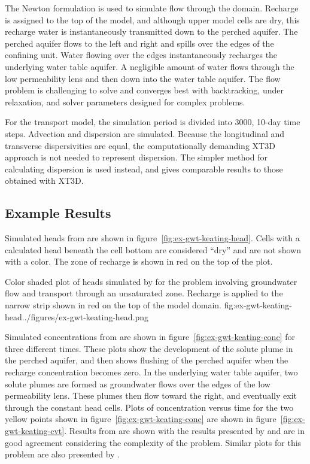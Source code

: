 The Newton formulation is used to simulate flow through the domain.  Recharge is assigned to the top of the model, and although upper model cells are dry, this recharge water is instantaneously transmitted down to the perched aquifer.  The perched aquifer flows to the left and right and spills over the edges of the confining unit.  Water flowing over the edges instantaneously recharges the underlying water table aquifer.  A negligible amount of water flows through the low permeability lens and then down into the water table aquifer.  The flow problem is challenging to solve and converges best with backtracking, under relaxation, and solver parameters designed for complex problems.

For the transport model, the simulation period is divided into 3000, 10-day time steps.  Advection and dispersion are simulated.  Because the longitudinal and transverse dispersivities are equal, the computationally demanding XT3D approach is not needed to represent dispersion.  The simpler method for calculating dispersion is used instead, and gives comparable results to those obtained with XT3D.  



\subsection{Example Results}

Simulated heads from \mf are shown in figure~\ref{fig:ex-gwt-keating-head}.  Cells with a calculated head beneath the cell bottom are considered ``dry'' and are not shown with a color.   The zone of recharge is shown in red on the top of the plot.  

\begin{StandardFigure}{
                                     Color shaded plot of heads simulated by \mf for the \cite{keating2009stable} problem involving groundwater flow and transport through an unsaturated zone.  Recharge is applied to the narrow strip shown in red on the top of the model domain.
                                     }{fig:ex-gwt-keating-head}{../figures/ex-gwt-keating-head.png}
\end{StandardFigure}                                 

Simulated concentrations from \mf are shown in figure~\ref{fig:ex-gwt-keating-conc} for three different times.  These plots show the development of the solute plume in the perched aquifer, and then shows flushing of the perched aquifer when the recharge concentration becomes zero.  In the underlying water table aquifer, two solute plumes are formed as groundwater flows over the edges of the low permeability lens.  These plumes then flow toward the right, and eventually exit through the constant head cells.  Plots of concentration versus time for the two yellow points shown in figure~\ref{fig:ex-gwt-keating-conc} are shown in figure~\ref{fig:ex-gwt-keating-cvt}.  Results from \mf are shown with the results presented by \cite{keating2009stable} and are in good agreement considering the complexity of the problem.  Similar plots for this problem are also presented by \cite{mt3dusgs}.

